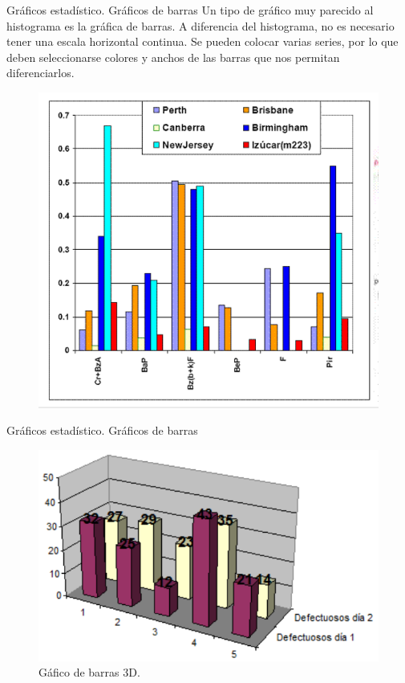 \documentclass[11pt]{beamer}
\begin{document}
      \begin{frame}{Gráficos estadístico. Gráficos de barras}
          Un tipo de gráfico muy parecido al histograma es la gráfica de barras.   A diferencia del histograma, no es necesario tener una escala horizontal continua. Se pueden colocar varias series, por lo que deben seleccionarse colores y anchos de las barras que nos permitan diferenciarlos.
          \begin{figure}
              \centering
              \includegraphics[width=0.5\linewidth]{images/graficos_barra1}
              \label{fig:graficosbarra1}
          \end{figure}
      \end{frame}

      \begin{frame}{Gráficos estadístico. Gráficos de barras}

        \begin{figure}
          \centering
          \includegraphics[width=0.7\linewidth]{images/graficos_barra2}
          \caption{Gáfico de barras 3D.}
          \label{fig:graficosbarra2}
        \end{figure}
      \end{frame}
\end{document}

